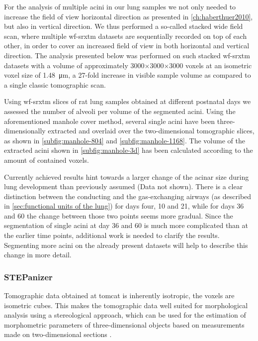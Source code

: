 For the analysis of multiple acini in our lung samples we not only needed to increase the field of view horizontal direction as presented in \autoref{ch:haberthuer2010}, but also in vertical direction. We thus performed a so-called stacked wide field scan, where multiple \ac{wf-srxtm} datasets are sequentially recorded on top of each other, in order to cover an increased field of view in both horizontal and vertical direction. The analysis presented below was performed on such stacked \ac{wf-srxtm} datasets with a volume of approximately 3000$\times$3000$\times$3000 voxels at an isometric voxel size of \SI{1.48}{\micro\meter}, \ie a 27-fold increase in visible sample volume as compared to a single classic tomographic scan.

Using \ac{wf-srxtm} slices of rat lung samples obtained at different postnatal days we assessed the number of alveoli per volume of the segmented acini. Using the aforementioned manhole cover method, several single acini have been three-dimensionally extracted and overlaid over the two-dimensional tomographic slices, as shown in \autoref{subfig:manhole-804} and \ref{subfig:manhole-1168}. The volume of the extracted acini shown in \autoref{subfig:manhole-3d} has been calculated according to the amount of contained voxels.

Currently achieved results hint towards a larger change of the acinar size during lung development than previously assumed (Data not shown). There is a clear distinction between the conducting and the gas-exchanging airways (as described in \autoref{sec:functional units of the lung}) for days four, 10 and 21, while for days 36 and 60 the change between those two points seems more gradual. Since the segmentation of single acini at day 36 and 60 is much more complicated than at the earlier time points, additional work is needed to clarify the results. Segmenting more acini on the already present datasets will help to describe this change in more detail.

\subsubsection{STEPanizer}\label{sec:stepanizer}
Tomographic data obtained at \ac{tomcat} is inherently isotropic, \ie the voxels are isometric cubes. This makes the tomographic data well suited for morphological analysis using a stereological approach, which can be used for the estimation of morphometric parameters of three-dimensional objects based
on measurements made on two-di\-men\-sion\-al sections \cite{Vanhecke2007}.

